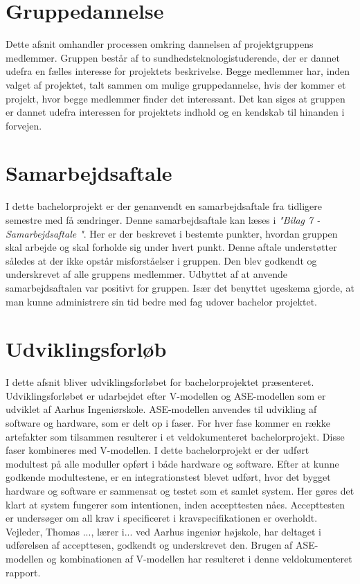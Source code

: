\chapter{Gruppedannelse}
Dette afsnit omhandler processen omkring dannelsen af projektgruppens medlemmer. Gruppen består af to sundhedsteknologistuderende, der er dannet udefra en fælles interesse for projektets beskrivelse. Begge medlemmer har, inden valget af projektet, talt sammen om mulige gruppedannelse, hvis der kommer et projekt, hvor begge medlemmer finder det interessant. Det kan siges at gruppen er dannet udefra interessen for projektets indhold og en kendskab til hinanden i forvejen.     



\chapter{Samarbejdsaftale}
I dette bachelorprojekt er der genanvendt en samarbejdsaftale fra tidligere semestre med få ændringer. Denne samarbejdsaftale kan læses i \textit{"Bilag 7 - Samarbejdsaftale "}. Her er der beskrevet i bestemte punkter, hvordan gruppen skal arbejde og skal forholde sig under hvert punkt. Denne aftale understøtter således at der ikke opstår misforståelser i gruppen. Den blev godkendt og underskrevet af alle gruppens medlemmer. Udbyttet af at anvende samarbejdsaftalen var positivt for gruppen. Især det benyttet ugeskema gjorde, at man kunne administrere sin tid bedre med fag udover bachelor projektet. 



\chapter{Udviklingsforløb}

I dette afsnit bliver udviklingsforløbet for bachelorprojektet præsenteret. Udviklingsforløbet er udarbejdet efter V-modellen og ASE-modellen \cite{IngeniorhojskolenAarhusUniversiteta} som er udviklet af Aarhus Ingeniørskole. ASE-modellen anvendes til udvikling af software og hardware, som er delt op i faser. For hver fase kommer en række artefakter som tilsammen resulterer i et veldokumenteret bachelorprojekt. Disse faser kombineres med V-modellen. I dette bachelorprojekt er der udført modultest på alle moduller opført i både hardware og software. Efter at kunne godkende modultestene, er en integrationstest blevet udført, hvor det bygget hardware og software er sammensat og testet som et samlet system. Her gøres det klart at system fungerer som intentionen, inden accepttesten nåes. Accepttesten er undersøger om all krav i specificeret i kravspecifikationen er overholdt. Vejleder, Thomas ..., lærer i... ved Aarhus ingeniør højskole, har deltaget i udførelsen af accepttesen, godkendt og underskrevet den. 
Brugen af ASE-modellen og kombinationen af V-modellen har resulteret i denne veldokumenteret rapport.   

